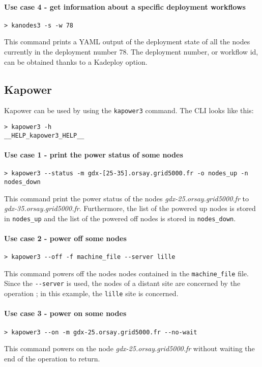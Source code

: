 \documentclass[a4wide,10pt,oneside]{book}
\begin{document}
\paragraph{Use case 4 - get information about a specific deployment workflows}
\begin{verbatim}
> kanodes3 -s -w 78
\end{verbatim}
This command prints a YAML output of the deployment state of all the nodes currently in the deployment number 78. The deployment number, or workflow id, can be obtained thanks to a Kadeploy option.

\subsection{Kapower}\label{sec:kapower}
Kapower can be used by using the \texttt{kapower3} command. The CLI looks like this:
\begin{small}
\begin{verbatim}
> kapower3 -h
__HELP_kapower3_HELP__
\end{verbatim}
\end{small}

\paragraph{Use case 1 - print the power status of some nodes}
\begin{verbatim}
> kapower3 --status -m gdx-[25-35].orsay.grid5000.fr -o nodes_up -n nodes_down
\end{verbatim}
This command print the power status of the nodes \textit{gdx-25.orsay.grid5000.fr} to \textit{gdx-35.orsay.grid5000.fr}. Furthermore, the list of the powered up nodes is stored in \texttt{nodes\_up} and the list of the powered off nodes is stored in \texttt{nodes\_down}.

\paragraph{Use case 2 - power off some nodes}
\begin{verbatim}
> kapower3 --off -f machine_file --server lille
\end{verbatim}
This command powers off the nodes nodes contained in the \texttt{machine\_file} file. Since the \texttt{-{}-server} is used, the nodes of a distant site are concerned by the operation ; in this example, the \texttt{lille} site is concerned.

\paragraph{Use case 3 - power on some nodes}
\begin{verbatim}
> kapower3 --on -m gdx-25.orsay.grid5000.fr --no-wait
\end{verbatim}
This command powers on the node \textit{gdx-25.orsay.grid5000.fr} without waiting the end of the operation to return.
\end{document}
